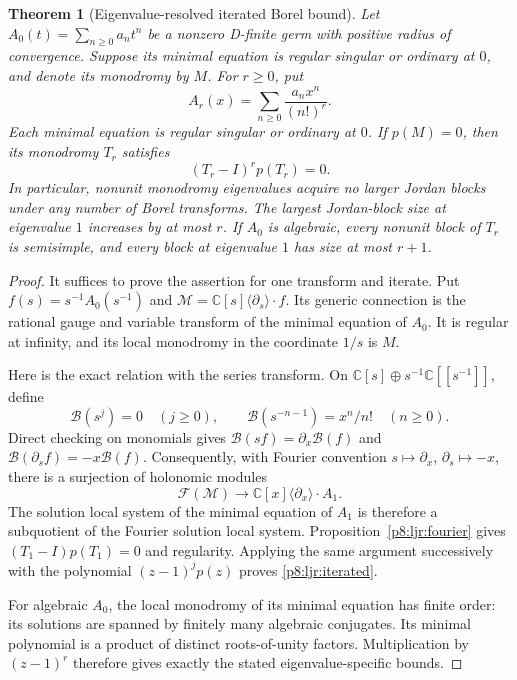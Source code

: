 \documentclass[11pt,a4paper]{article}
\newtheorem{theorem}{Theorem}[section]
\theoremstyle{definition}
\theoremstyle{remark}
\numberwithin{equation}{section}
\begin{document}
\begin{theorem}[Eigenvalue-resolved iterated Borel bound]\label{p8:ljr:borel}
Let $A_0(t)=\sum_{n\ge0}a_nt^n$ be a nonzero D-finite germ with
positive radius of convergence. Suppose its minimal equation is
regular singular or ordinary at $0$, and denote its monodromy by
$M$. For $r\ge0$, put
\[
                  A_r(x)=\sum_{n\ge0}\frac{a_nx^n}{(n!)^r}.
\]
Each minimal equation is regular singular or ordinary at $0$.
If $p(M)=0$, then its monodromy $T_r$ satisfies
\begin{equation}\label{p8:ljr:iterated}
                      (T_r-I)^r p(T_r)=0.
\end{equation}
In particular, nonunit monodromy eigenvalues acquire no larger
Jordan blocks under any number of Borel transforms. The largest
Jordan-block size at eigenvalue $1$ increases by at most $r$.
If $A_0$ is algebraic, every nonunit block of $T_r$ is semisimple,
and every block at eigenvalue $1$ has size at most $r+1$.
\end{theorem}
\begin{proof}
It suffices to prove the assertion for one transform and iterate.
Put $f(s)=s^{-1}A_0(s^{-1})$ and
$\mathcal M=\mathbb C[s]\langle\partial_s\rangle\cdot f$.
Its generic connection is the rational gauge and variable transform
of the minimal equation of $A_0$.  It is regular at infinity, and
its local monodromy in the coordinate $1/s$ is $M$.

Here is the exact relation with the series transform. On
$\mathbb C[s]\oplus s^{-1}\mathbb C[[s^{-1}]]$, define
\[
 \mathcal B(s^j)=0\quad(j\ge0),\qquad
 \mathcal B(s^{-n-1})=x^n/n!\quad(n\ge0).
\]
Direct checking on monomials gives
$\mathcal B(sf)=\partial_x\mathcal B(f)$ and
$\mathcal B(\partial_sf)=-x\mathcal B(f)$.
Consequently, with Fourier convention
$s\mapsto\partial_x$, $\partial_s\mapsto-x$, there is a
surjection of holonomic modules
\[
                   \mathcal F(\mathcal M)
                       \longrightarrow
                   \mathbb C[x]\langle\partial_x\rangle\cdot A_1.
\]
The solution local system of the minimal equation of $A_1$ is
therefore a subquotient of the Fourier solution local system.
Proposition~\ref{p8:ljr:fourier} gives $(T_1-I)p(T_1)=0$ and
regularity. Applying the same argument successively with the
polynomial $(z-1)^j p(z)$ proves \eqref{p8:ljr:iterated}.

For algebraic $A_0$, the local monodromy of its minimal equation
has finite order: its solutions are spanned by finitely many
algebraic conjugates. Its minimal polynomial is a product of
distinct roots-of-unity factors. Multiplication by $(z-1)^r$
therefore gives exactly the stated eigenvalue-specific bounds.
\end{proof}
\end{document}
